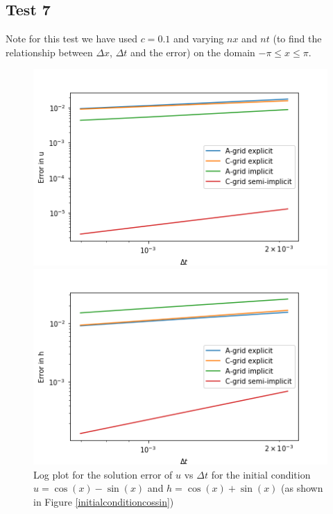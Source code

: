 \documentclass[a4paper,12pt, notitlepage]{article}
\begin{document}
{\subsection{Test 7}
Note for this test we have used $c = 0.1$ and varying $nx$ and $nt$ (to find the relationship between $\Delta x$, $\Delta t$ and the error) on the domain $-\pi \leq x \leq \pi$.
\begin{figure} [H]
	\begin{minipage}{.5\textwidth}
	\ContinuedFloat*
	\captionsetup{width=0.9\textwidth}
	\captionsetup{justification=centering}
	\includegraphics[width=\textwidth]{uerror_compared_dt_cossin.png}
	\caption{\label{uerrorcossindt}Log plot for the solution error of $u$ vs $\Delta t$ for the initial condition $u = \cos(x) - \sin(x)$ and $h = \cos(x) + \sin(x)$ (as shown in Figure \ref{initialconditioncossin})} 
\end{minipage}
\begin{minipage}{.5\textwidth}
	\ContinuedFloat
	\captionsetup{width=0.9\textwidth}
	\captionsetup{justification=centering}
	\includegraphics[width=\textwidth]{herror_compared_dt_cossin.png}

\end{minipage}
\end{figure}}
\end{document}
